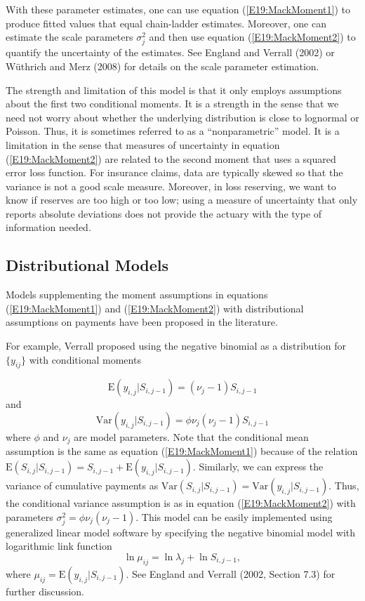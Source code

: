 With these parameter estimates, one can use equation
(\ref{E19:MackMoment1}) to produce fitted values that equal
chain-ladder estimates. Moreover, one can estimate the scale
parameters $\sigma^2_j$ and then use equation
(\ref{E19:MackMoment2}) to quantify the uncertainty of the
estimates. See England and Verrall (2002) or W\"{u}thrich and Merz
(2008) for details on the scale parameter estimation.

The strength and limitation of this model is that it only employs
assumptions about the first two conditional moments. It is a
strength in the sense that we need not worry about whether the
underlying distribution is close to lognormal or Poisson. Thus, it
is sometimes referred to as a ``nonparametric'' model. It is a
limitation in the sense that measures of uncertainty in equation
(\ref{E19:MackMoment2}) are related to the second moment that uses a
squared error loss function. For insurance claims, data are
typically skewed so that the variance is not a good scale measure.
Moreover, in loss reserving, we want to know if reserves are too
high or too low; using a measure of uncertainty that only reports
absolute deviations does not provide the actuary with the type of
information needed.


\subsection{Distributional Models}

Models supplementing the moment assumptions in equations
(\ref{E19:MackMoment1}) and (\ref{E19:MackMoment2}) with
distributional assumptions on payments have been proposed in the
literature.

For example, Verrall proposed using the negative binomial as a
distribution for $\{y_{ij}\}$ with conditional moments

\begin{equation*}
\mathrm{E} \left( y_{i,j} | S_{i,j-1} \right) = (\nu_j-1) S_{i,j-1}
\end{equation*}
and
\begin{equation*}
\mathrm{Var} \left( y_{i,j} | S_{i,j-1} \right) = \phi \nu_j (\nu_j
-1) S_{i,j-1}
\end{equation*}
where $\phi$ and $\nu_j$ are model parameters. Note that the
conditional mean assumption is the same as equation
(\ref{E19:MackMoment1}) because of the relation $\mathrm{E} \left(
S_{i,j} | S_{i,j-1} \right) = S_{i,j-1} + \mathrm{E} \left( y_{i,j}
| S_{i,j-1} \right)$. Similarly, we can express the variance of
cumulative payments as $\mathrm{Var} \left( S_{i,j} | S_{i,j-1}
\right) = \mathrm{Var} \left( y_{i,j} | S_{i,j-1} \right)$. Thus,
the conditional variance assumption is as in equation
(\ref{E19:MackMoment2}) with parameters $ \sigma^2_j=\phi \nu_j
(\nu_j -1)$. This model can be easily implemented using generalized
linear model software by specifying the negative binomial model with
logarithmic link function
\begin{equation*}
\ln \mu_{ij} = \ln \lambda_j + \ln S_{i,j-1},
\end{equation*}
where $\mu_{ij} = \mathrm{E} \left( y_{i,j} | S_{i,j-1} \right)$.
See England and Verrall (2002, Section 7.3) for further discussion.

